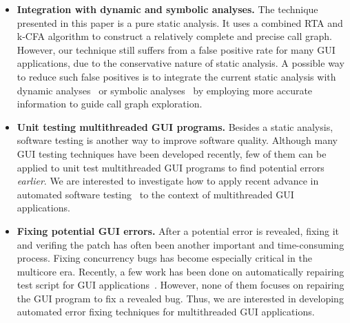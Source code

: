 \begin{itemize}

\item \textbf{Integration with dynamic and symbolic analyses.} The technique 
presented in this paper is a pure static analysis. It
uses a combined RTA and k-CFA  algorithm to construct a relatively
complete and precise call graph. However, our technique still suffers from
a false positive rate for many GUI applications, due to the conservative
nature of static analysis. A possible way to reduce such false
positives is to integrate the current static analysis with
dynamic analyses~\cite{Jiang:2008:PPS:1453101.1453110, ZhangSBE2011}
or symbolic analyses~\cite{xie05:symstra, Pasareanu:2011, halfond09issta, BMF97}
by employing more accurate information to guide call graph exploration.

\item \textbf{Unit testing multithreaded GUI programs.} Besides
a static analysis,  software testing is another
way to improve software quality.  Although many
GUI testing techniques have been developed recently, few of them can be applied
to unit test multithreaded GUI programs to find potential errors \textit{earlier}. We
are interested to investigate how to apply recent advance in automated
software testing~\cite{Staats:2011:PTO:1985793.1985847, Jagannath:2011:IMU:2025113.2025145, Muccini_Bertolino_Inverardi_2004, Ricca:2001:ATW:381473.381476, Harman:2007}
to the context of multithreaded GUI applications.


\item \textbf{Fixing potential GUI errors.} After a potential error is revealed, fixing
it and verifing the patch has often been another important and time-consuming process. Fixing concurrency
bugs has become especially critical in the multicore era.
Recently, a few work has been done
on automatically repairing test script for GUI applications~\cite{Daniel:2011:AGR:2002931.2002937, Huang:2010:RGT:1828417.1828465}. However, none of them focuses on repairing
the GUI program to fix a revealed bug. Thus, we are interested in 
developing automated error fixing techniques for
multithreaded GUI applications.

\end{itemize}
